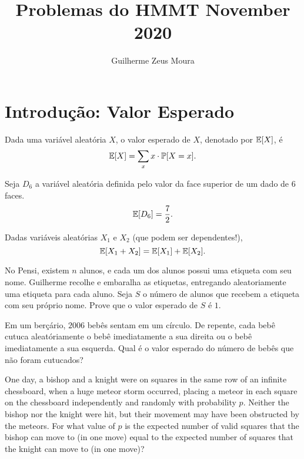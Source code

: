 \documentclass[10pt,a4paper]{article}
\title{Problemas do HMMT November 2020}
\author{Guilherme Zeus Moura}
\begin{document}
	
	\zeustitle

	\section{Introdução: Valor Esperado}

	\begin{defn}
		Dada uma variável aleatória $X$, o valor esperado de $X$, denotado por $\mathbb{E}[X]$, é \[ \mathbb{E}[X] = 
		\sum_{x} x \cdot \mathbb{P}[X = x].\]	
	\end{defn}

	\begin{exmp}
		Seja $D_6$ a variável aleatória definida pelo valor da face superior de um dado de $6$ faces. 
		\[ \mathbb{E}[D_6] = \frac{7}{2}.\]	
	\end{exmp}

	\begin{thm}
		Dadas variáveis aleatórias $X_1$ e $X_2$ (que podem ser dependentes!), \[\mathbb{E}[X_1 + X_2] = \mathbb{E}[X_1] + \mathbb{E}[X_2].\]
	\end{thm}

	\begin{prob}
		No Pensi, existem $n$ alunos, e cada um dos alunos possui uma etiqueta com seu nome. Guilherme recolhe e embaralha as etiquetas, entregando aleatoriamente uma etiqueta para cada aluno. Seja $S$ o número de alunos que recebem a etiqueta com seu próprio nome. Prove que o valor esperado de $S$ é $1$.
	\end{prob}

	\begin{prob}
		Em um berçário, $2006$ bebês sentam em um círculo. De repente, cada bebê cutuca aleatóriamente o bebê imediatamente a sua direita ou o bebê imediatamente a sua esquerda. Qual é o valor esperado do número de bebês que não foram cutucados?
	\end{prob}

	\begin{prob}[NIMO 4.3]
One day, a bishop and a knight were on squares in the same row of an infinite chessboard, when a huge meteor storm occurred, placing a meteor in each square on the chessboard independently and randomly with probability $p$.
Neither the bishop nor the knight were hit, but their movement may have been obstructed by the meteors.
For what value of $p$ is the expected number of valid squares that the bishop can move to (in one move) equal to the expected number of squares that the knight can move to (in one move)?
	\end{prob}
\end{document}
